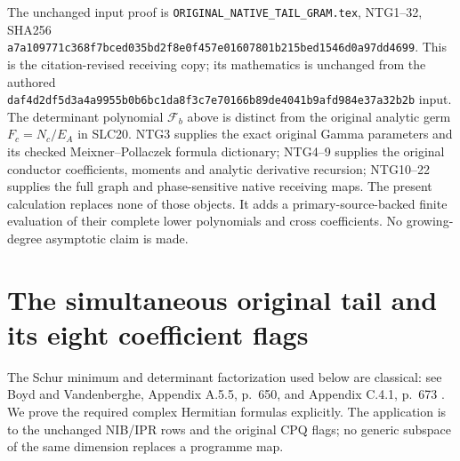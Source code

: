 \documentclass[11pt,a4paper]{article}
\begin{document}
The unchanged input proof is
\texttt{ORIGINAL\_\allowbreak NATIVE\_\allowbreak TAIL\_\allowbreak GRAM.tex}, NTG1--32,
SHA256
\texttt{a7a10977\allowbreak 1c368f7b\allowbreak ced035bd\allowbreak 2f8e0f45\allowbreak 7e016078\allowbreak 01b215be\allowbreak d1546d0a\allowbreak 97dd4699}.
This is the citation-revised receiving copy; its mathematics
is unchanged from the authored
\texttt{daf4d2df\allowbreak 5d3a4a99\allowbreak 55b0b6bc\allowbreak 1da8f3c7\allowbreak e70166b8\allowbreak 9de4041b\allowbreak 9afd984e\allowbreak 37a32b2b}
input. The determinant polynomial $\mathcal F_b$ above
is distinct from the original analytic germ $F_c=N_c/E_A$
in SLC20.
NTG3 supplies the exact original Gamma parameters
and its checked Meixner--Pollaczek formula dictionary;
NTG4--9 supplies the original conductor coefficients,
moments and analytic derivative recursion; NTG10--22
supplies the full graph and phase-sensitive native
receiving maps. The present calculation replaces
none of those objects. It adds a primary-source-backed
finite evaluation of their complete lower polynomials
and cross coefficients. No growing-degree asymptotic
claim is made.
\par\endgroup
\endgroup

\label{MTBUILD:SZEGO_LOWER_GRID_CONTROL:end}

\clearpage
\label{MTBUILD:SIMULTANEOUS_TAIL_FLAGS:start}
\begingroup
\section{The simultaneous original tail and its eight coefficient flags}
\label{sec:STF}

The Schur minimum and determinant factorization used below are classical:
see Boyd and Vandenberghe, Appendix A.5.5, p.~650, and Appendix C.4.1,
p.~673 \cite{human:boyd-vandenberghe}. We prove the required complex
Hermitian formulas explicitly. The application is to the unchanged
NIB/IPR rows and the original CPQ flags; no generic subspace of the same
dimension replaces a programme map.
\end{document}

